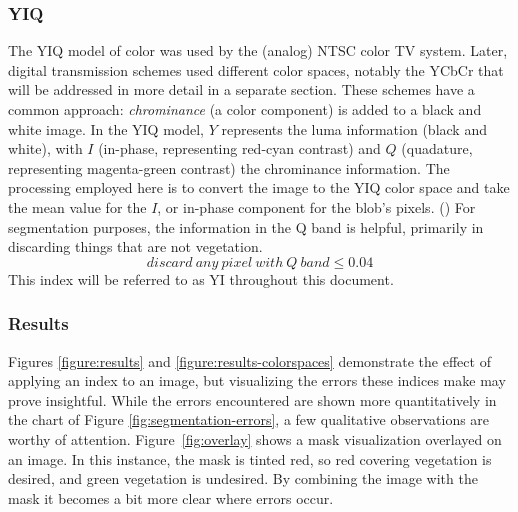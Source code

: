 \documentclass[letterpaper]{article}
\begin{document}
{\subsubsection{YIQ}
The YIQ model of color was used by the (analog) NTSC color TV system. Later, digital transmission schemes used different color spaces, notably the YCbCr that will be addressed in more detail in a separate section. These schemes have a common approach: \textit{chrominance} (a color component) is added to a black and white image. In the YIQ model, $Y$ represents the luma information (black and white), with $I$ (in-phase, representing red-cyan contrast) and $Q$ (quadature, representing magenta-green contrast) the chrominance information. 
The processing employed here is to convert the image to the YIQ color space and take the mean value for the $I$, or in-phase component for the blob's pixels. (\cite{MathWorks_undated-jg}) For segmentation purposes, the information in the Q band is helpful, primarily in discarding things that are not vegetation.
\begin{equation}
	\label{equation:yiq}
	discard\ any\ pixel\ with\ Q\ band\leq 0.04
\end{equation}
This index will be referred to as YI throughout this document.


\subsubsection{Results}
Figures \ref{figure:results} and \ref{figure:results-colorspaces} demonstrate the effect of applying an index to an image, but visualizing the errors these indices make may prove insightful. While the errors encountered are shown more quantitatively in the chart of Figure \ref{fig:segmentation-errors}, a few qualitative observations are worthy of attention.  Figure~\ref{fig:overlay} shows a mask visualization overlayed on an image. In this instance, the mask is tinted red, so red covering vegetation is desired, and green vegetation is undesired. By combining the image with the mask it becomes a bit more clear where errors occur.

}
\end{document}
